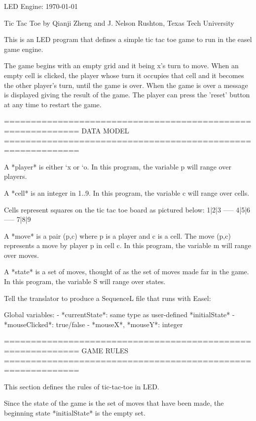 \documentclass{led_doc}
\begin{document}
LED Engine: \today \hrulefill

\begin{ledCmnt}
Tic Tac Toe
by Qianji Zheng and J. Nelson Rushton, Texas Tech University

This is an LED program that defines a simple tic tac toe game to run in the easel game engine.

The game begins with an empty grid and it being x's turn to move. When an empty cell is clicked, the player whose turn it occupies that cell and it becomes the other player's turn, until the game is over. When the game is over a message is displayed giving the result of the  game. The player can press the 'reset' button at any time to restart the game.

============================================================
DATA MODEL
============================================================

A *player* is either `x or `o. In this program, the variable p will range over players.

A *cell* is an integer in {1..9}. In this program, the variable c will range over cells.

Cells represent squares on the tic tac toe board as pictured below:
    1|2|3
    -----
    4|5|6
    -----
    7|8|9

A *move* is a pair (p,c) where p is a player and c is a cell. The move (p,c) represents a move by player p in cell c. In this program, the variable m will range over moves.

A *state* is a set of moves, thought of as the set of moves made far in the game. In this program, the variable S will range over states.

Tell the translator to produce a SequenceL file that runs with Easel:
\end{ledCmnt}

\begin{ledCmnt}
Global variables:
- *currentState*: same type as user-defined *initialState*
- *mouseClicked*: true/false
- *mouseX*, *mouseY*: integer

============================================================
GAME RULES
============================================================

This section defines the rules of tic-tac-toe in LED.

Since the state of the game is the set of moves that have been made, the beginning state *initialState* is the empty set.
\end{ledCmnt}
\end{document}

